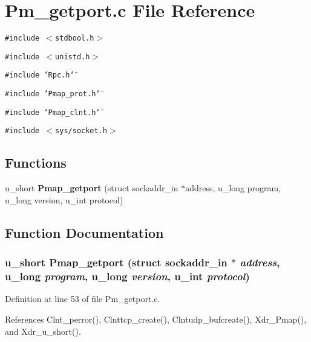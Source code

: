 \section{Pm\_\-getport.c File Reference}
\label{Pm__getport_8c}
{\tt \#include $<$stdbool.h$>$}\par
{\tt \#include $<$unistd.h$>$}\par
{\tt \#include \char`\"{}Rpc.h\char`\"{}}\par
{\tt \#include \char`\"{}Pmap\_\-prot.h\char`\"{}}\par
{\tt \#include \char`\"{}Pmap\_\-clnt.h\char`\"{}}\par
{\tt \#include $<$sys/socket.h$>$}\par
\subsection*{Functions}
\begin{CompactItemize}
\item 
u\_\-short {\bf Pmap\_\-getport} (struct sockaddr\_\-in $\ast$address, u\_\-long program, u\_\-long version, u\_\-int protocol)
\end{CompactItemize}


\subsection{Function Documentation}
\subsubsection{\setlength{\rightskip}{0pt plus 5cm}u\_\-short Pmap\_\-getport (struct sockaddr\_\-in $\ast$ {\em address}, u\_\-long {\em program}, u\_\-long {\em version}, u\_\-int {\em protocol})}\label{Pm__getport_8c_a2}




Definition at line 53 of file Pm\_\-getport.c.

References Clnt\_\-perror(), Clnttcp\_\-create(), Clntudp\_\-bufcreate(), Xdr\_\-Pmap(), and Xdr\_\-u\_\-short().